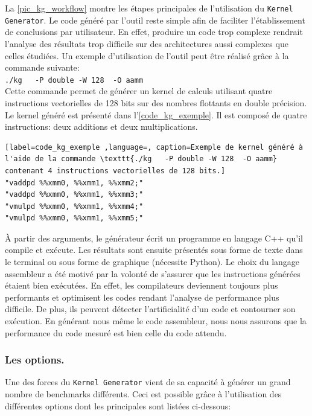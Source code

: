         La \autoref{pic_kg_workflow} montre les étapes principales de l'utilisation du \verb|Kernel Generator|. Le code généré par l'outil reste simple afin de faciliter l'établissement de conclusions par utilisateur. En effet, produire un code trop complexe rendrait l'analyse des résultats trop difficile sur des  architectures aussi complexes que celles étudiées. Un exemple d'utilisation de l'outil peut être réalisé grâce à la commande suivante:\\
        \verb|./kg   -P double -W 128  -O aamm|\\
        Cette commande permet de générer un kernel de calculs utilisant quatre instructions vectorielles de 128 bits sur des nombres flottants en double précision. Le kernel généré est présenté dans l'\autoref{code_kg_exemple}. Il est composé de quatre instructions: deux additions et deux multiplications.
        
\begin{minipage}{0.97\linewidth}
\begin{lstlisting}[label=code_kg_exemple ,language=, caption=Exemple de kernel généré à l'aide de la commande \texttt{./kg   -P double -W 128  -O aamm} contenant 4 instructions vectorielles de 128 bits.]
"vaddpd %%xmm0, %%xmm1, %%xmm2;"
"vaddpd %%xmm0, %%xmm1, %%xmm3;"
"vmulpd %%xmm0, %%xmm1, %%xmm4;"
"vmulpd %%xmm0, %%xmm1, %%xmm5;"
\end{lstlisting} 
\end{minipage}

        À partir des arguments, le générateur écrit un programme en langage C++ qu'il compile et exécute. Les résultats sont ensuite présentés sous forme de texte dans le terminal ou sous forme de graphique (nécessite Python).
        Le choix du langage assembleur a été motivé par la volonté de s'assurer que les instructions générées étaient bien exécutées. En effet, les compilateurs deviennent toujours plus performants et optimisent les codes rendant l'analyse de performance plus difficile. De plus, ils peuvent détecter l'artificialité d'un code et contourner son exécution. En générant nous même le code assembleur, nous nous assurons que la performance du code mesuré est bien celle du code attendu.
    
       
    \subsubsection{Les options.}\label{sec:kg_option} 
    
        Une des forces du \verb|Kernel Generator| vient de sa capacité à générer un grand nombre de benchmarks différents. Ceci est possible grâce à l'utilisation des différentes options dont les principales sont listées ci-dessous:
    
